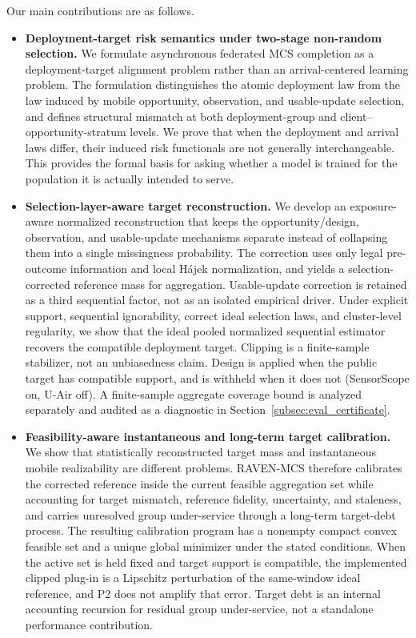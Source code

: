\documentclass[letterpaper,journal]{IEEEtran}
\begin{document}
Our main contributions are as follows.

\begin{itemize}
    \item \textbf{Deployment-target risk semantics under two-stage non-random
    selection.}
    We formulate asynchronous federated MCS completion as a
    deployment-target alignment problem rather than an arrival-centered
    learning problem.  The formulation distinguishes the atomic deployment law
    from the law induced by mobile opportunity, observation, and usable-update
    selection, and defines structural mismatch at both deployment-group and
    client--opportunity-stratum levels.  We prove that when the deployment and
    arrival laws differ, their induced risk functionals are not generally
    interchangeable.  This provides the formal basis for asking whether a model
    is trained for the population it is actually intended to serve.

    \item \textbf{Selection-layer-aware target reconstruction.}
    We develop an exposure-aware normalized reconstruction that keeps the
    opportunity/design, observation, and usable-update mechanisms separate
    instead of collapsing them into a single missingness probability.  The
    correction uses only legal pre-outcome information and local
    H\'ajek normalization, and yields a selection-corrected reference mass
    for aggregation.  Usable-update correction is retained as a third
    sequential factor, not as an isolated empirical driver.
    Under explicit support,
    sequential ignorability, correct ideal selection laws, and cluster-level
    regularity, we show that the ideal pooled normalized sequential estimator
    recovers the compatible deployment target.  Clipping is a finite-sample
    stabilizer, not an unbiasedness claim.  Design is applied when the
    public target has compatible support, and is withheld when it does
    not (SensorScope on, U-Air off).  A finite-sample aggregate coverage
    bound is analyzed separately and audited as a diagnostic in
    Section~\ref{subsec:eval_certificate}.

    \item \textbf{Feasibility-aware instantaneous and long-term target
    calibration.}
    We show that statistically reconstructed target mass and instantaneous
    mobile realizability are different problems.  RAVEN-MCS therefore
    calibrates the corrected reference inside the current feasible aggregation
    set while accounting for target mismatch, reference fidelity, uncertainty,
    and staleness, and carries unresolved group under-service through a
    long-term target-debt process.  The resulting calibration program has a
    nonempty compact convex feasible set and a unique global minimizer under the
    stated conditions.  When the active set is held fixed and target support is
    compatible, the implemented clipped plug-in is a Lipschitz perturbation of
    the same-window ideal reference, and P2 does not amplify that error.
    Target debt is an internal accounting recursion for residual
    group under-service, not a standalone performance contribution.
\end{itemize}
\end{document}
